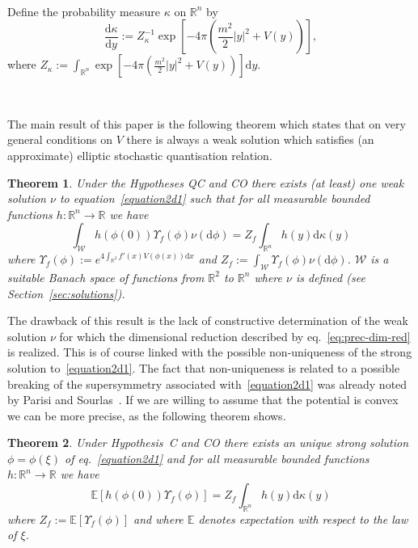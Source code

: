 \documentclass[a4paper,10pt]{article}
\newcommand{\assign}{:=}
\newcommand{\mathd}{\mathrm{d}}
\newtheorem{theorem}{Theorem}
\begin{document}
\

Define the probability measure $\kappa$ on $\mathbb{R}^n$ by
\begin{equation}
  \frac{\mathd \kappa}{\mathd y} \assign Z_{\kappa}^{- 1} \exp \left[ - 4 \pi
  \left( \frac{m^2}{2} | y |^2 + V (y) \right) \right], \label{eq:gibbs-kappa}
\end{equation}
where $Z_{\kappa} \assign \int_{\mathbb{R}^n} \exp \left[ - 4 \pi \left(
\frac{m^2}{2} | y |^2 + V (y) \right) \right] \mathd y$.

\

The main result of this paper is the following theorem which states that on
very general conditions on $V$ there is always a weak solution which satisfies
(an approximate) elliptic stochastic quantisation relation.

\begin{theorem}
  \label{th:dim-red-qc}Under the Hypotheses QC and CO there exists (at least)
  one weak solution $\nu$ to equation~{\eqref{equation2d1}} such that for all
  measurable bounded functions $h : \mathbb{R}^n \rightarrow \mathbb{R}$ we
  have
  \begin{equation}
    \int_{\mathcal{W}} h (\phi (0)) \Upsilon_f (\phi) \nu (\mathd \phi) = Z_f
    \int_{\mathbb{R}^n} h (y) \mathd \kappa (y) \label{eq:prec-dim-red}
  \end{equation}
  where $\Upsilon_f (\phi) \assign e^{4 \int_{\mathbb{R}^2} f' (x) V (\phi
  (x)) \mathd x}$ and $Z_f \assign \int_{\mathcal{W}} \Upsilon_f (\phi) \nu
  (\mathd \phi)$. $\mathcal{W}$ is a suitable Banach space of functions from
  $\mathbb{R}^2$ to $\mathbb{R}^n$ where $\nu$ is defined (see
  Section~\ref{sec:solutions}).
\end{theorem}

The drawback of this result is the lack of constructive determination of the
weak solution $\nu$ for which the dimensional reduction described by
eq.~{\eqref{eq:prec-dim-red}} is realized. This is of course linked with the
possible non-uniqueness of the strong solution to~{\eqref{equation2d1}}. The
fact that non-uniqueness is related to a possible breaking of the
supersymmetry associated with~{\eqref{equation2d1}} was already noted by
Parisi and Sourlas~{\cite{parisi_supersymmetric_1982}}. If we are willing to
assume that the potential is convex we can be more precise, as the following
theorem shows.

\begin{theorem}
  \label{th:dim-red-1}Under Hypothesis~C and CO there exists an unique strong
  solution $\phi = \phi (\xi)$ of eq.~{\eqref{equation2d1}} and for all
  measurable bounded functions $h : \mathbb{R}^n \rightarrow \mathbb{R}$ we
  have
  \begin{equation}
    \mathbb{E} [h (\phi (0)) \Upsilon_f (\phi)] = Z_f \int_{\mathbb{R}^n} h
    (y) \mathd \kappa (y) \label{eq:prec-dim-red-c}
  \end{equation}
  where $Z_f \assign \mathbb{E} [\Upsilon_f (\phi)]$ and where $\mathbb{E}$
  denotes expectation with respect to the law of $\xi$.
\end{theorem}
\end{document}
